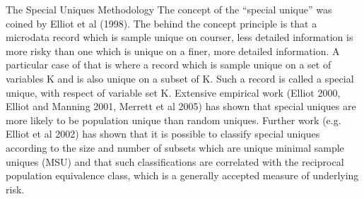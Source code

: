 The Special Uniques Methodology
The concept of the “special unique” was coined by Elliot et al (1998). The behind the
concept principle is that a microdata record which is sample unique on courser, less
detailed information is more risky than one which is unique on a finer, more detailed
information. A particular case of that is where a record which is sample unique on a
set of variables K and is also unique on a subset of K. Such a record is called a
special unique, with respect of variable set K.
Extensive empirical work (Elliot 2000, Elliot and Manning 2001, Merrett et al 2005)
has shown that special uniques are more likely to be population unique than random
uniques. Further work (e.g. Elliot et al 2002) has shown that it is possible to classify
special uniques according to the size and number of subsets which are unique
minimal sample uniques (MSU) and that such classifications are correlated with the
reciprocal population equivalence class, which is a generally accepted measure of
underlying risk. 

